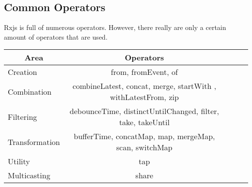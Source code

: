 \subsection{ Common Operators }
Rxjs is full of numerous operators. However, there really are only a certain
amount of operators that are used. 
\begin{center}
  \begin{tabular}{@{} l *4c @{}}
    \toprule
    \multicolumn{1}{c}{\color{red}Area} & Operators \\
    \midrule
    Creation       & from, fromEvent, of \\
    Combination    & combineLatest, concat, merge, startWith , withLatestFrom, zip \\
    Filtering      & debounceTime, distinctUntilChanged, filter, take, takeUntil \\
    Transformation & bufferTime, concatMap, map, mergeMap, scan, switchMap \\
    Utility        & tap \\
    Multicasting   & share \\
  \end{tabular}
\end{center}  



